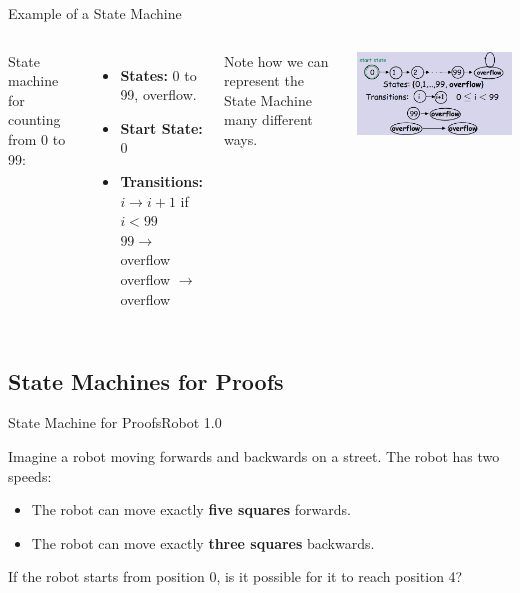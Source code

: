 \begin{frame}[t]{Example of a State Machine}

  \begin{columns}
    State machine for counting from 0 to 99:
    \begin{itemize}
      \item {\bf States:} 0 to 99, overflow.
      \item {\bf Start State:} 0
      \item {\bf Transitions:}\\
        $i \to i+1$ if $i < 99$\\
        $99 \to$ overflow\\
        overflow $\to$ overflow\\
    \end{itemize}\bigskip

    Note how we can represent the State Machine many different ways.

    \includegraphics[width=1\textwidth]{../img/statemachine}
  \end{columns}
\end{frame}

\subsection{State Machines for Proofs}
\begin{frame}{State Machine for Proofs}{Robot 1.0}

  Imagine a robot moving forwards and backwards on a street. The robot has two speeds:
  \begin{itemize}
    \item The robot can move exactly {\bf five squares} forwards.
    \item The robot can move exactly {\bf three squares} backwards.
  \end{itemize}
  \bigskip

  If the robot starts from position 0, is it possible for it to reach position 4?
\end{frame}

